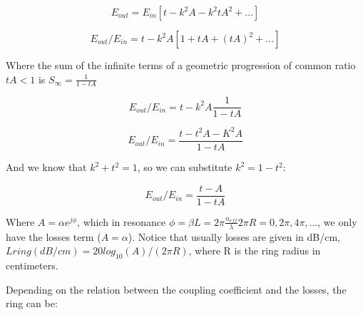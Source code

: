 \documentclass[journal]{IEEEtran}
\begin{document}

\begin{equation}
	E_{out}=E_{in}[t-k^2A-k^2tA^2 + \ldots]
\end{equation} 

\begin{equation}
	E_{out}/E_{in}=t-k^2A[1+tA + (tA)^2 +  \ldots]
\end{equation} 

Where the sum of the infinite terms of a geometric progression of common ratio $tA<1$ is $ S_\infty = \frac{1}{1-tA} $

\begin{equation}
	E_{out}/E_{in}=t-k^2A\frac{1}{1-tA}
\end{equation} 

\begin{equation}
	E_{out}/E_{in}=\frac{t-t^2A-K^2A}{1-tA}
\end{equation} 

And we know that $k^2+t^2=1$, so we can substitute $k^2=1-t^2$:

\begin{equation}
	E_{out}/E_{in}=\frac{t-A}{1-tA}
\label{eq:transmissionRing}
\end{equation}

Where $A=\alpha e^{j\phi}$, which in resonance $\phi=\beta L=2\pi \frac{ n_{eff}}{\lambda} 2 \pi R= 0,2\pi,4\pi,\ldots$, we only have the losses term ($A=\alpha$). Notice that usually losses are given in dB/cm, $L{ring}(dB/cm)=20log_{10}(A)/(2\pi R)$, where R is the ring radius in centimeters.


Depending on the relation between the coupling coefficient and the losses, the ring can be:
\end{document}
